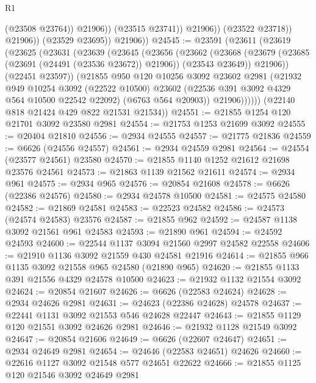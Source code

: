 \begin{lexlean}{R1}
\begin{coremodule}
                            (@23508 @23764))
                          @21906))
                      (@23515 @23741))
                    @21906))
                (@23522 @23718))
              @21906))
          (@23529 @23695))
        @21906))
@24545 := @23591
    (@23611
      (@23619
        (@23625
          (@23631
            (@23639
              (@23645
                (@23656
                  (@23662
                    (@23668
                      (@23679 (@23685 (@23691 (@24491 (@23536 @23672)) @21906)) (@23543 @23649))
                      @21906))
                  (@22451 @23597))
                (@21855
                  @950
                  @120
                  @10256
                  @3092
                  @23602
                  @2981
                  (@21932
                    @949
                    @10254
                    @3092
                    (@22522 @10500)
                    @23602
                    (@22536 @391 @3092 @4329 @564 @10500 @22542 @22092)
                    (@6763 @564 @20903))
                  @21906))))))
      (@22140 @818 @21424 @429 @822 @21531 @21534))
@24551 := @21855 @1254 @120 @21701 @3092 @23580 @2981
@24554 := @21753 @1253 @21699 @3092
@24555 := @20404 @21810
@24556 := @2934 @24555
@24557 := @21775 @21836
@24559 := @6626 (@24556 @24557)
@24561 := @2934 @24559 @2981
@24564 := @24554 (@23577 @24561) @23580
@24570 := @21855 @1140 @1252 @21612 @21698 @23576 @24561
@24573 := @21863 @1139 @21562 @21611
@24574 := @2934 @961
@24575 := @2934 @965
@24576 := @20854 @21608
@24578 := @6626 (@22386 @24576)
@24580 := @2934 @24578 @10500
@24581 := @24575 @24580
@24582 := @21869 @24581
@24583 := @22523 @24582
@24586 := @24573 (@24574 @24583) @23576
@24587 := @21855 @962
@24592 := @24587 @1138 @3092 @21561 @961 @24583
@24593 := @21890 @961
@24594 := @24592 @24593
@24600 := @22544 @1137 @3094 @21560 @2997 @24582 @22558
@24606 := @21910 @1136 @3092 @21559 @430 @24581 @21916
@24614 := @21855 @966 @1135 @3092 @21558 @965 @24580 (@21890 @965)
@24620 := @21855 @1133 @391 @21556 @4329 @24578 @10500
@24623 := @21932 @1132 @21554 @3092
@24624 := @20854 @21607
@24626 := @6626 (@22583 @24624)
@24628 := @2934 @24626 @2981
@24631 := @24623 (@22386 @24628) @24578
@24637 := @22441 @1131 @3092 @21553 @546 @24628 @22447
@24643 := @21855 @1129 @120 @21551 @3092 @24626 @2981
@24646 := @21932 @1128 @21549 @3092
@24647 := @20854 @21606
@24649 := @6626 (@22607 @24647)
@24651 := @2934 @24649 @2981
@24654 := @24646 (@22583 @24651) @24626
@24660 := @22616 @1127 @3092 @21548 @577 @24651 @22622
@24666 := @21855 @1125 @120 @21546 @3092 @24649 @2981

\end{coremodule}
\end{lexlean}
